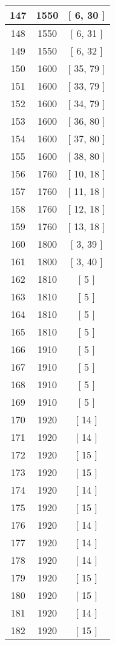 \begin{center}
\begin{longtable}[H]{|| c c c ||}
\hline
147 & 1550 & [ 6, 30 ] \\ 
\hline
148 & 1550 & [ 6, 31 ] \\ 
\hline
149 & 1550 & [ 6, 32 ] \\ 
\hline
150 & 1600 & [ 35, 79 ] \\ 
\hline
151 & 1600 & [ 33, 79 ] \\ 
\hline
152 & 1600 & [ 34, 79 ] \\ 
\hline
153 & 1600 & [ 36, 80 ] \\ 
\hline
154 & 1600 & [ 37, 80 ] \\ 
\hline
155 & 1600 & [ 38, 80 ] \\ 
\hline
156 & 1760 & [ 10, 18 ] \\ 
\hline
157 & 1760 & [ 11, 18 ] \\ 
\hline
158 & 1760 & [ 12, 18 ] \\ 
\hline
159 & 1760 & [ 13, 18 ] \\ 
\hline
160 & 1800 & [ 3, 39 ] \\ 
\hline
161 & 1800 & [ 3, 40 ] \\ 
\hline
162 & 1810 & [ 5 ] \\ 
\hline
163 & 1810 & [ 5 ] \\ 
\hline
164 & 1810 & [ 5 ] \\ 
\hline
165 & 1810 & [ 5 ] \\ 
\hline
166 & 1910 & [ 5 ] \\ 
\hline
167 & 1910 & [ 5 ] \\ 
\hline
168 & 1910 & [ 5 ] \\ 
\hline
169 & 1910 & [ 5 ] \\ 
\hline
170 & 1920 & [ 14 ] \\ 
\hline
171 & 1920 & [ 14 ] \\ 
\hline
172 & 1920 & [ 15 ] \\ 
\hline
173 & 1920 & [ 15 ] \\ 
\hline
174 & 1920 & [ 14 ] \\ 
\hline
175 & 1920 & [ 15 ] \\ 
\hline
176 & 1920 & [ 14 ] \\ 
\hline
177 & 1920 & [ 14 ] \\ 
\hline
178 & 1920 & [ 14 ] \\ 
\hline
179 & 1920 & [ 15 ] \\ 
\hline
180 & 1920 & [ 15 ] \\ 
\hline
181 & 1920 & [ 14 ] \\ 
\hline
182 & 1920 & [ 15 ] \\ 

\end{longtable}
\end{center}

